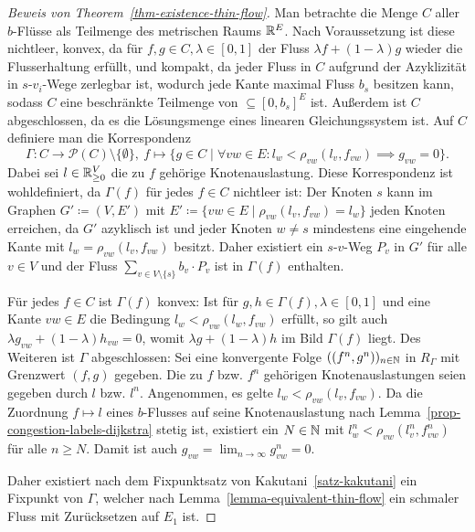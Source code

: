 \begin{proof}[Beweis von Theorem~\ref{thm-existence-thin-flow}]
	Man betrachte die Menge $C$ aller $b$-Flüsse als Teilmenge des metrischen Raums $\mathbb{R}^E$.
	Nach Voraussetzung ist diese nichtleer, konvex, da für $f, g\in C, \lambda \in [0,1]$ der Fluss $\lambda f + (1-\lambda)g$ wieder die Flusserhaltung erfüllt, und kompakt, da jeder Fluss in $C$ aufgrund der Azyklizität in $s$-$v_i$-Wege zerlegbar ist, wodurch jede Kante maximal Fluss $b_s$ besitzen kann, sodass $C$ eine beschränkte Teilmenge von $\subseteq [0, b_s]^E$ ist.
	Außerdem ist $C$ abgeschlossen, da es die Lösungsmenge eines linearen Gleichungssystem ist.
	Auf $C$ definiere man die Korrespondenz
	\[
	\Gamma: C\to \mathcal{P}(C)\setminus\{ \emptyset \}, ~ f\mapsto \{ g\in C \mid \forall vw\in E: l_w < \rho_{vw}(l_v, f_{vw}) \implies g_{vw} = 0 \}.
	\]
	Dabei sei $l\in\mathbb{R}_{\geq 0}^V$ die zu $f$ gehörige Knotenauslastung.
	Diese Korrespondenz ist wohldefiniert, da $\Gamma(f)$ für jedes $f\in C$ nichtleer ist:
	Der Knoten $s$ kann im Graphen $G'\coloneq (V, E')$ mit $E'\coloneq \{ vw\in E \mid \rho_{vw}(l_v, f_{vw})=l_w \}$ jeden Knoten erreichen, da $G'$ azyklisch ist und jeder Knoten $w\neq s$ mindestens eine eingehende Kante mit $l_w = \rho_{vw}(l_v, f_{vw})$ besitzt. 
	Daher existiert ein $s$-$v$-Weg $P_v$ in $G'$ für alle $v\in V$ und der Fluss $\sum_{v\in V\setminus\{ s\}} b_v \cdot P_v$ ist in $\Gamma(f)$ enthalten.
	
	Für jedes $f\in C$ ist $\Gamma(f)$ konvex: Ist für $g, h\in \Gamma(f), \lambda\in [0,1]$ und eine Kante $vw\in E$ die Bedingung $l_w < \rho_{vw}(l_w, f_{vw})$ erfüllt, so gilt auch $\lambda g_{vw} + (1-\lambda) h_{vw} = 0$, womit $\lambda g + (1-\lambda)h$ im Bild $\Gamma(f)$ liegt.
	Des Weiteren ist $\Gamma$ abgeschlossen: 
	Sei eine konvergente Folge $((f^{n}, g^{n}))_{n\in\mathbb{N}}$ in $R_\Gamma$ mit Grenzwert $(f, g)$ gegeben.
	Die zu $f$ bzw. $f^n$ gehörigen Knotenauslastungen seien gegeben durch $l$ bzw. $l^n$.
	Angenommen, es gelte $l_w < \rho_{vw}(l_v, f_{vw})$.
	Da die Zuordnung $f\mapsto l$ eines $b$-Flusses auf seine Knotenauslastung nach Lemma~\ref{prop-congestion-labels-dijkstra} stetig ist, existiert ein $N\in\mathbb{N}$ mit $l_w^n<\rho_{vw}(l_v^n, f_{vw}^n)$ für alle $n\geq N$.
	Damit ist auch $g_{vw} = \lim_{n\to\infty} g_{vw}^n = 0$.
	
	Daher existiert nach dem Fixpunktsatz von Kakutani~\ref{satz-kakutani} ein Fixpunkt von $\Gamma$, welcher nach Lemma~\ref{lemma-equivalent-thin-flow} ein schmaler Fluss mit Zurücksetzen auf $E_1$ ist.
\end{proof}

